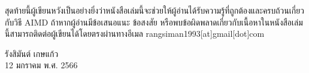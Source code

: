 {สุดท้ายนี้ผู้เขียนหวังเป็นอย่างยิ่งว่าหนังสือเล่มนี้จะช่วยให้ผู้อ่านได้รับความรู้ที่ถูกต้องและครบถ้วนเกี่ยวกับวิธี AIMD ถ้าหากผู้อ่านมีข้อเสนอแนะ ข้อสงสัย%
หรือพบข้อผิดพลาดเกี่ยวกับเนื้อหาในหนังสือเล่มนี้สามารถติดต่อผู้เขียนได้โดยตรงผ่านทางอีเมล rangsiman1993[at]gmail[dot]com

\medskip

\begin{flushright}
รังสิมันต์ เกษแก้ว \\
12 มกราคม พ.ศ. 2566
\end{flushright}
}
